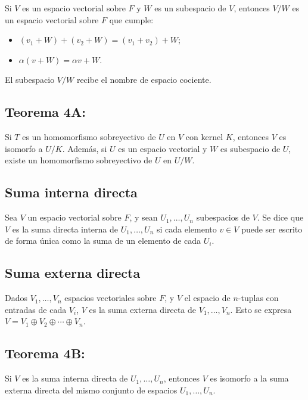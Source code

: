 \documentclass{article}
\begin{document}
Si $V$ es un espacio vectorial sobre $F$ y $W$ es un subespacio de $V$, entonces $V/W$ es un espacio vectorial sobre $F$ que cumple:
\begin{itemize}

\item $(v_1+W)+(v_2+W)=(v_1+v_2)+W$;

\item $\alpha(v+W)=\alpha v+W$.

\end{itemize}
El subespacio $V/W$ recibe el nombre de espacio cociente.

\subsection*{\color{red} Teorema 4A:}

Si $T$ es un homomorfismo sobreyectivo de $U$ en $V$ con kernel $K$, entonces $V$ es isomorfo a $U/K$. Además, si $U$ es un espacio vectorial y $W$ es subespacio de $U$, existe un homomorfismo sobreyectivo de $U$ en $U/W$.

\subsection*{\color{violet} Suma interna directa}

Sea $V$ un espacio vectorial sobre $F$, y sean $U_1,\ldots,U_n$ subespacios de $V$. Se dice que $V$ es la suma directa interna de $U_1,\ldots,U_n$ si cada elemento $v\in V$ puede ser escrito de forma única como la suma de un elemento de cada $U_i$. 

\subsection*{\color{violet} Suma externa directa}

Dados $V_1,\ldots,V_n$ espacios vectoriales sobre $F$, y $V$ el espacio de $n$-tuplas con entradas de cada $V_i$, $V$ es la suma externa directa de $V_1,\ldots,V_n$. Esto se expresa $V=V_1\oplus V_2\oplus\cdots\oplus V_n$.

\subsection*{\color{red} Teorema 4B:}

Si $V$ es la suma interna directa de $U_1,\ldots,U_n$, entonces $V$ es isomorfo a la suma externa directa del mismo conjunto de espacios $U_1,\ldots,U_n$.
\end{document}

